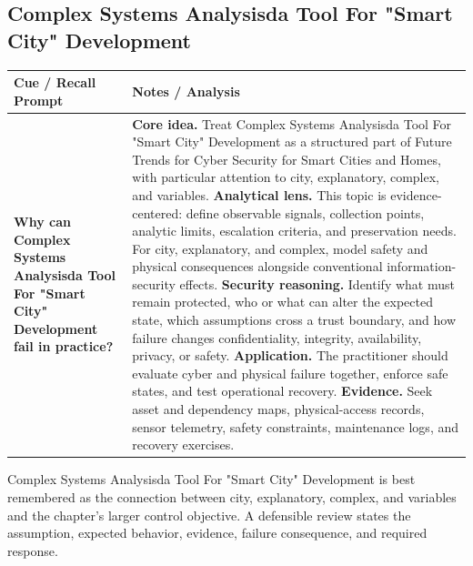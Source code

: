 \documentclass[11pt]{article}
\newcommand{\CornellHeader}{%
\rowcolor{Navy}\color{white}\bfseries Cue / Recall Prompt & \color{white}\bfseries Notes / Analysis\\\hline}
\newcommand{\CornellRow}[2]{%
\cellcolor{CueGray}\RaggedRight\textbf{#1} & \RaggedRight #2\\\hline}
\begin{document}
\subsection*{Complex Systems Analysisda Tool For "Smart City" Development}
\begin{longtable}{>{\RaggedRight\arraybackslash}p{}|>{\RaggedRight\arraybackslash}p{}}
\CornellHeader
\CornellRow{Why can Complex Systems Analysisda Tool For "Smart City" Development fail in practice?}{\textbf{Core idea.} Treat Complex Systems Analysisda Tool For "Smart City" Development as a structured part of Future Trends for Cyber Security for Smart Cities and Homes, with particular attention to city, explanatory, complex, and variables. \textbf{Analytical lens.} This topic is evidence-centered: define observable signals, collection points, analytic limits, escalation criteria, and preservation needs. For city, explanatory, and complex, model safety and physical consequences alongside conventional information-security effects. \textbf{Security reasoning.} Identify what must remain protected, who or what can alter the expected state, which assumptions cross a trust boundary, and how failure changes confidentiality, integrity, availability, privacy, or safety. \textbf{Application.} The practitioner should evaluate cyber and physical failure together, enforce safe states, and test operational recovery. \textbf{Evidence.} Seek asset and dependency maps, physical-access records, sensor telemetry, safety constraints, maintenance logs, and recovery exercises.}
\end{longtable}
\begin{topicsummary}
Complex Systems Analysisda Tool For "Smart City" Development is best remembered as the connection between city, explanatory, complex, and variables and the chapter's larger control objective. A defensible review states the assumption, expected behavior, evidence, failure consequence, and required response.
\end{topicsummary}
\end{document}
